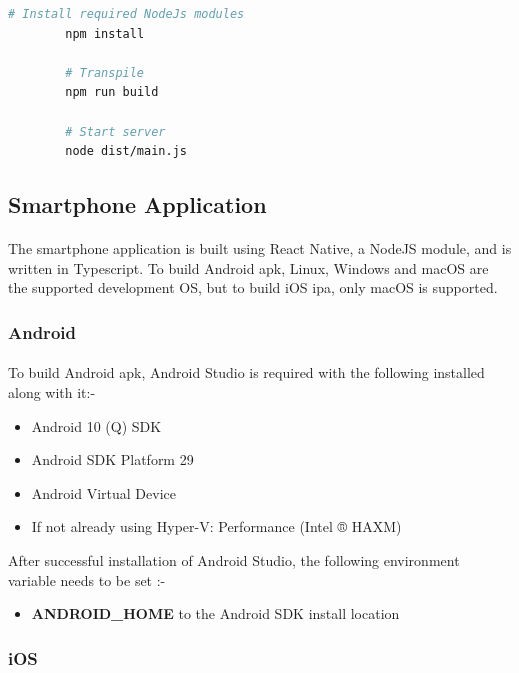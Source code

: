 \documentclass[12pt]{article}
\begin{document}
        \begin{lstlisting}[language=bash, caption=\acrshort{lrrs} Server]
        # Install required NodeJs modules
        npm install
    
        # Transpile
        npm run build
    
        # Start server
        node dist/main.js
        \end{lstlisting}
    
    \subsection{Smartphone Application}
        \paragraph{}
        The smartphone application is built using React Native, a NodeJS module, and is written in Typescript. To build Android \acrshort{apk}, Linux, Windows and macOS are the supported development OS, but to build iOS \acrshort{ipa}, only macOS is supported.
        \subsubsection{Android}
            \paragraph{}
            To build Android \acrshort{apk}, Android Studio is required with the following installed along with it:- 
            \begin{itemize}
                \item Android 10 (Q) SDK
                \item Android SDK Platform 29
                \item Android Virtual Device
                \item If not already using Hyper-V: Performance (Intel ® HAXM)
            \end{itemize}
            After successful installation of Android Studio, the following environment variable needs to be set :-
            \begin{itemize}
                \item \textbf{ANDROID\_HOME} to the Android SDK install location
            \end{itemize}
        
        \subsubsection{iOS}
\end{document}
